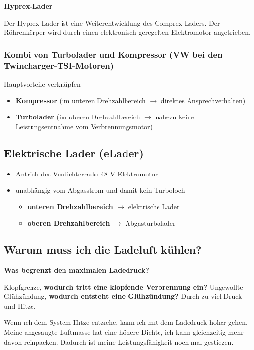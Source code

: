 \textbf{Hyprex-Lader}

Der Hyprex-Lader ist eine Weiterentwicklung des Comprex-Laders. Der
Röhrenkörper wird durch einen elektronisch geregelten Elektromotor
angetrieben.

\subsubsection{Kombi von Turbolader und Kompressor (VW bei den
Twincharger-TSI-Motoren)}\label{kombi-von-turbolader-und-kompressor-vw-bei-den-twincharger-tsi-motoren}

Hauptvorteile verknüpfen

\begin{itemize}
\item
  \textbf{Kompressor} (im unteren Drehzahlbereich $\to$ direktes
  Ansprechverhalten)
\item
  \textbf{Turbolader} (im oberen Drehzahlbereich $\to$ nahezu keine
  Leistungsentnahme vom Verbrennungsmotor)
\end{itemize}

\subsection{Elektrische Lader (eLader)}\label{elektrische-lader-elader}

\begin{itemize}
\item
  Antrieb des Verdichterrads: 48 V Elektromotor
\item
  unabhängig vom Abgasstrom und damit kein Turboloch

  \begin{itemize}
  \item
    \textbf{unteren Drehzahlbereich} $\to$ elektrische Lader
  \item
    \textbf{oberen Drehzahlbereich} $\to$ Abgasturbolader
  \end{itemize}
\end{itemize}

\subsection{Warum muss ich die Ladeluft
kühlen?}\label{warum-muss-ich-die-ladeluft-kuehlen}

\textbf{Was begrenzt den maximalen Ladedruck?}

Klopfgrenze, \textbf{wodurch tritt eine klopfende Verbrennung ein?}
Ungewollte Glühzündung, \textbf{wodurch entsteht eine Glühzündung?}
Durch zu viel Druck und Hitze.

Wenn ich dem System Hitze entziehe, kann ich mit dem Ladedruck höher
gehen. Meine angesaugte Luftmasse hat eine höhere Dichte, ich kann
gleichzeitig mehr davon reinpacken. Dadurch ist meine Leistungsfähigkeit
noch mal gestiegen.
